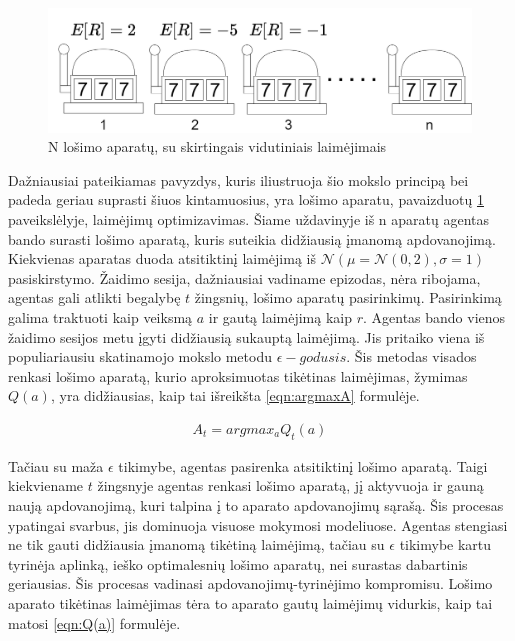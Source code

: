 \documentclass[a4paper, 12pt]{article}
\begin{document}
\begin{figure}[h]
\centering
\includegraphics[width=1\textwidth]{losimoaparatai}
\caption{N lošimo aparatų, su skirtingais vidutiniais laimėjimais}
\label{losimoaparatai}
\end{figure}


Dažniausiai pateikiamas pavyzdys, kuris iliustruoja šio mokslo principą bei padeda geriau suprasti šiuos kintamuosius, yra lošimo aparatu, pavaizduotų \ref{losimoaparatai} paveikslėlyje, laimėjimų optimizavimas. Šiame uždavinyje iš n aparatų agentas bando surasti lošimo aparatą, kuris suteikia didžiausią įmanomą apdovanojimą. Kiekvienas aparatas duoda atsitiktinį laimėjimą iš  $\mathcal{N}(\mu=\mathcal{N}(0,2),\sigma=1)$ pasiskirstymo. Žaidimo sesija, dažniausiai vadiname epizodas, nėra ribojama, agentas gali atlikti begalybę $t$ žingsnių, lošimo aparatų pasirinkimų. Pasirinkimą galima traktuoti kaip veiksmą $a$ ir gautą laimėjimą kaip $r$. Agentas bando vienos žaidimo sesijos metu įgyti didžiausią sukauptą laimėjimą. Jis pritaiko viena iš populiariausiu skatinamojo mokslo metodu $\epsilon-godusis$. Šis metodas visados renkasi lošimo aparatą, kurio aproksimuotas tikėtinas laimėjimas, žymimas $Q(a)$, yra didžiausias, kaip tai išreikšta \ref {eqn:argmaxA} formulėje.

\begin{equation}
\label{eqn:argmaxA}
\begin{gathered}
A_t = argmax_aQ_t(a)
\end{gathered}
\end{equation}

Tačiau su maža $\epsilon$ tikimybe, agentas pasirenka atsitiktinį lošimo aparatą. Taigi kiekviename $t$ žingsnyje agentas renkasi lošimo aparatą, jį aktyvuoja ir gauną naują apdovanojimą, kuri talpina į to aparato apdovanojimų sąrašą. Šis procesas ypatingai svarbus, jis dominuoja visuose mokymosi modeliuose. Agentas stengiasi ne tik gauti didžiausia įmanomą tikėtiną laimėjimą, tačiau su $\epsilon$ tikimybe kartu tyrinėja aplinką, ieško optimalesnių lošimo aparatų, nei surastas dabartinis geriausias. Šis procesas vadinasi apdovanojimų-tyrinėjimo  kompromisu. Lošimo aparato tikėtinas laimėjimas tėra to aparato gautų laimėjimų vidurkis, kaip tai matosi \ref{eqn:Q(a)} formulėje.
\end{document}
